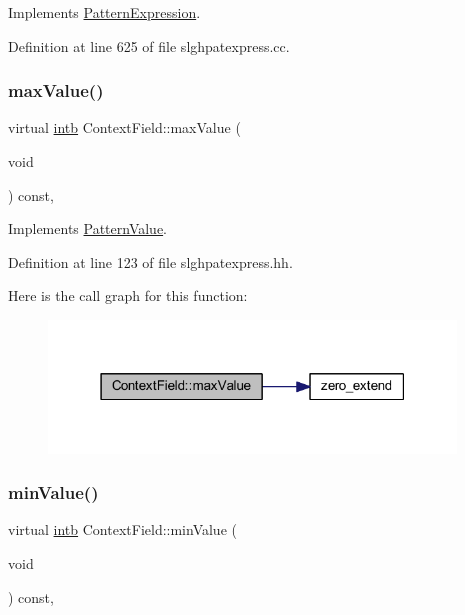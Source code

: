 Implements \mbox{\hyperlink{class_pattern_expression_a8332c6ea4c5a7e9dfc690df2a6458bb8}{Pattern\+Expression}}.



Definition at line 625 of file slghpatexpress.\+cc.

\mbox{\label{class_context_field_aa72fece0728c113a1218bb0c756e0a1d}} 
\subsubsection{\texorpdfstring{maxValue()}{maxValue()}}
{\footnotesize\ttfamily virtual \mbox{\hyperlink{types_8h_aa925ba3e627c2df89d5b1cfe84fb8572}{intb}} Context\+Field\+::max\+Value (\begin{DoxyParamCaption}\item[{void}]{ }\end{DoxyParamCaption}) const\hspace{0.3cm}{\ttfamily [inline]}, {\ttfamily [virtual]}}



Implements \mbox{\hyperlink{class_pattern_value_a865e8f34e031ef31f77dcaa93d76820d}{Pattern\+Value}}.



Definition at line 123 of file slghpatexpress.\+hh.

Here is the call graph for this function\+:
\nopagebreak
\begin{figure}[H]
\begin{center}
\leavevmode
\includegraphics[width=307pt]{class_context_field_aa72fece0728c113a1218bb0c756e0a1d_cgraph}
\end{center}
\end{figure}
\mbox{\label{class_context_field_a53a80959fd559909162619b5f899bb2e}} 
\subsubsection{\texorpdfstring{minValue()}{minValue()}}
{\footnotesize\ttfamily virtual \mbox{\hyperlink{types_8h_aa925ba3e627c2df89d5b1cfe84fb8572}{intb}} Context\+Field\+::min\+Value (\begin{DoxyParamCaption}\item[{void}]{ }\end{DoxyParamCaption}) const\hspace{0.3cm}{\ttfamily [inline]}, {\ttfamily [virtual]}}



